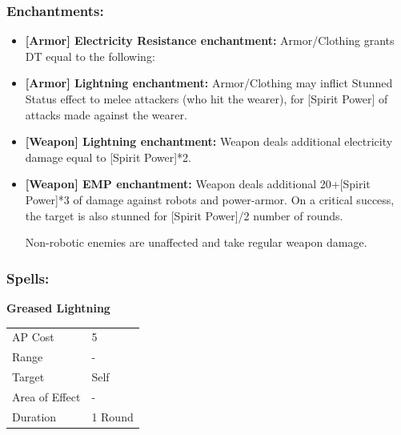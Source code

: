 \documentclass[11pt,a4paper,twocolumn]{book}
\begin{document}
\medskip
\subsubsection*{Enchantments:}

\begin{itemize}
  \item \textbf{ [Armor] Electricity Resistance enchantment:} Armor/Clothing grants DT equal to the following:
  \item \textbf{ [Armor] Lightning enchantment:} Armor/Clothing may inflict Stunned Status effect to melee attackers (who hit the wearer), for [Spirit Power] of attacks made against the wearer.
  \item \textbf{ [Weapon] Lightning enchantment:} Weapon deals additional electricity damage equal to [Spirit Power]*2.
  \item \textbf{ [Weapon] EMP enchantment:} Weapon deals additional 20+[Spirit Power]*3 of damage against robots and power-armor. On a critical success, the target is also stunned for [Spirit Power]/2 number of rounds.

	Non-robotic enemies are unaffected and take regular weapon damage.
\end{itemize}

\subsubsection*{Spells:}

\smallskip
\noindent
\textbf{Greased Lightning}

\smallskip
{
	\begin{tabu} to 70mm{| X[l,4] | X[l,7] |}
		\hline
        AP Cost	      	& 5 						\\
        Range     		& -				\\
        Target      	& Self		\\
        Area of Effect  & -  	 			\\
        Duration     	& 1 Round		\\ \hline
	\end{tabu}
		
}
\smallskip
\end{document}

